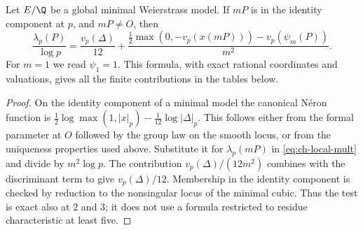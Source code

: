 \begin{statement}
Let $E/\Q$ be a global minimal Weierstrass model. If $mP$ is
in the identity component at $p$, and $mP\ne O$, then
\begin{equation}\label{eq:ch-local-exact}
 \frac{\lambda_p(P)}{\log p}
 =\frac{v_p(\Delta)}{12}
   +\frac{\frac12\max(0,-v_p(x(mP)))-v_p(\psi_m(P))}{m^2}.
\end{equation}
For $m=1$ we read $\psi_1=1$. This formula, with exact rational
coordinates and valuations, gives all the finite contributions
in the tables below.
\end{statement}
\begin{proof}
On the identity component of a minimal model the canonical
N\'eron function is
$\frac12\log\max(1,|x|_p)-\frac1{12}\log|\Delta|_p$.
This follows either from the formal parameter at $O$ followed
by the group law on the smooth locus, or from the uniqueness
properties used above. Substitute it for $\lambda_p(mP)$ in
\eqref{eq:ch-local-mult} and divide by $m^2\log p$.
The contribution $v_p(\Delta)/(12m^2)$ combines with the
discriminant term to give $v_p(\Delta)/12$.
Membership in the identity component is checked by reduction
to the nonsingular locus of the minimal cubic. Thus the test is
exact also at $2$ and $3$; it does not use a formula restricted
to residue characteristic at least five.
\end{proof}
